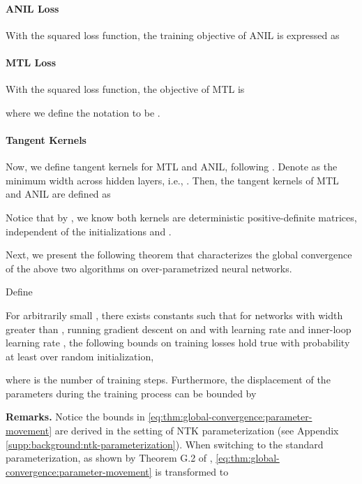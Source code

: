 \documentclass{article}
\begin{document}
\paragraph{ANIL Loss} 
With the squared loss function, the training objective of ANIL is expressed as

\paragraph{MTL Loss} 
With the squared loss function, the objective of MTL is

where we define the notation  to be .
\paragraph{Tangent Kernels} Now, we define tangent kernels for MTL and ANIL, following \citet{meta-ntk}. Denote  as the minimum width across hidden layers, i.e., . Then, the tangent kernels of MTL and ANIL are defined as

Notice that by \citet{meta-ntk}, we know both kernels are deterministic positive-definite matrices, independent of the initializations  and .

Next, we present the following theorem that characterizes the global convergence of the above two algorithms on over-parametrized neural networks.  

\begin{theorem} \label{thm:global-convergence}
Define 

For arbitrarily small , there exists constants  such that for networks with width greater than , running gradient descent on   and  with learning rate  and inner-loop learning rate , the following bounds on training losses hold true with probability at least  over random initialization,

where  is the number of training steps. Furthermore, the displacement of the parameters during the training process can be bounded by

\end{theorem}
\textbf{Remarks.} Notice the bounds in \eqref{eq:thm:global-convergence:parameter-movement} are derived in the setting of NTK parameterization (see Appendix \ref{supp:background:ntk-parameterization}). When switching to the standard parameterization, as shown by Theorem G.2 of \citet{lee2019wide}, \eqref{eq:thm:global-convergence:parameter-movement} is transformed to 
\end{document}
